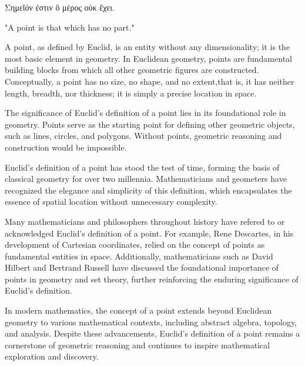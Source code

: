 
\begin{defin}
\textgreek{Σημεῖόν ἐστιν ὃ μέρος οὐκ ἔχει}.

"A point is that which has no part."
\end{defin}

A point, as defined by Euclid, is an entity without any dimensionality; it is the most basic element in geometry. In Euclidean geometry, points are fundamental building blocks from which all other geometric figures are constructed. Conceptually, a point has no size, no shape, and no extent,that is, it has neither length, breadth, nor thickness; it is simply a precise location in space.

The significance of Euclid's definition of a point lies in its foundational role in geometry. Points serve as the starting point for defining other geometric objects, such as lines, circles, and polygons. Without points, geometric reasoning and construction would be impossible.

Euclid's definition of a point has stood the test of time, forming the basis of classical geometry for over two millennia. Mathematicians and geometers have recognized the elegance and simplicity of this definition, which 
encapsulates the essence of spatial location without unnecessary complexity.

Many mathematicians and philosophers throughout history have refered to or acknowledged Euclid's definition of a point. 
For example, Rene Descartes, in his development of Cartesian coordinates, relied on the concept of points as fundamental entities in space. Additionally, mathematicians such as David Hilbert and Bertrand Russell have discussed the foundational importance of points in geometry and set theory, further reinforcing the enduring significance of Euclid's definition.

\clearpage

In modern mathematics, the concept of a point extends beyond Euclidean geometry to various mathematical contexts, including abstract algebra, topology, and analysis. Despite these advancements, Euclid's definition of a point remains a cornerstone of geometric reasoning and continues to inspire mathematical exploration and discovery.


\clearpage